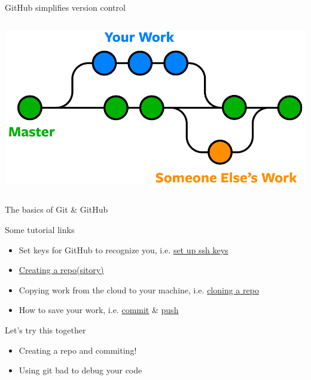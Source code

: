 \documentclass[aspectratio=169]{beamer}
\begin{document}
\begin{frame}[c]{GitHub simplifies version control}
\begin{columns}[T]
    \vspace{\baselineskip}

    \includegraphics[width=\textwidth]{figs/fig-git_branches_others.png}

  \end{columns}

\end{frame}

\begin{frame}{The basics of Git \& GitHub}

    \centering
    \begin{block}{Some tutorial links}
      \begin{itemize} 
      \item Set keys for GitHub to recognize you, i.e. \href{https://docs.github.com/en/authentication/connecting-to-github-with-ssh}{set up ssh keys}
      \item \href{https://docs.github.com/en/get-started/quickstart/create-a-repo}{Creating a repo(sitory)}
      \item Copying work from the cloud to your machine, i.e. \href{https://docs.github.com/en/repositories/creating-and-managing-repositories/cloning-a-repository}{cloning a repo}
      \item How to save your work, i.e. \href{https://github.com/git-guides/git-commit}{commit} \& \href{https://github.com/git-guides/git-push}{push}
    \end{itemize}
    \end{block}

    \vspace{\baselineskip}

    \begin{block}{Let's try this together}
      \begin{itemize} 
      \item Creating a repo and commiting!
      \item Using git bad to debug your code
    \end{itemize}
    \end{block}

\end{frame}
\end{document}
